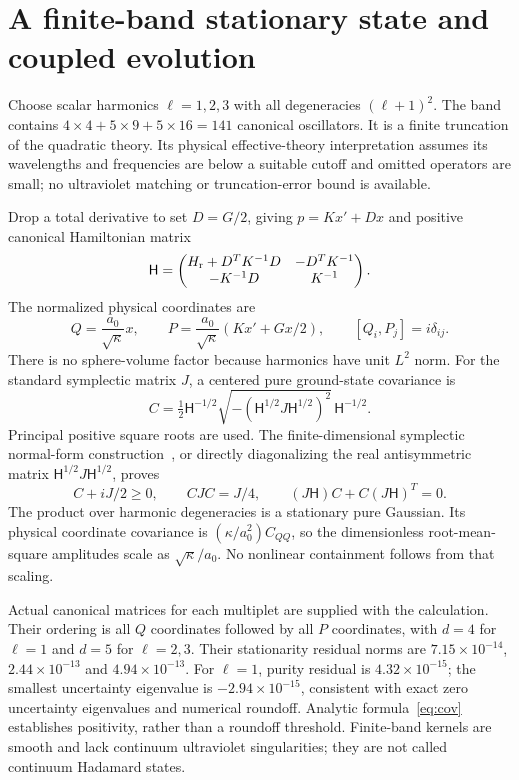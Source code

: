 \documentclass[11pt]{article}
\newcommand{\HH}{\mathsf H}
\numberwithin{equation}{section}
\begin{document}
\section{A finite-band stationary state and coupled evolution}

Choose scalar harmonics $\ell=1,2,3$ with all degeneracies $(\ell+1)^2$.
The band contains $4\times4+5\times9+5\times16=141$ canonical oscillators.
It is a finite truncation of the quadratic theory.
Its physical effective-theory interpretation assumes its wavelengths and frequencies are below a suitable cutoff and omitted operators are small; no ultraviolet matching or truncation-error bound is available.

Drop a total derivative to set $D=G/2$, giving $p=Kx'+Dx$ and positive canonical Hamiltonian matrix
\begin{equation}
 \HH=\begin{pmatrix}H_{\rm r}+D^TK^{-1}D&-D^TK^{-1}\\-K^{-1}D&K^{-1}\end{pmatrix}.
\end{equation}
The normalized physical coordinates are
\begin{equation}
 Q=\frac{a_0}{\sqrt\kappa}x,\qquad
 P=\frac{a_0}{\sqrt\kappa}(Kx'+Gx/2),\qquad [Q_i,P_j]=i\delta_{ij}.
 \label{eq:normalization}
\end{equation}
There is no sphere-volume factor because harmonics have unit $L^2$ norm.
For the standard symplectic matrix $J$, a centered pure ground-state covariance is
\begin{equation}
 C=\tfrac12\HH^{-1/2}
 \sqrt{-(\HH^{1/2}J\HH^{1/2})^2}\,\HH^{-1/2}.
 \label{eq:cov}
\end{equation}
Principal positive square roots are used.
The finite-dimensional symplectic normal-form construction~\cite{williamson}, or directly diagonalizing the real antisymmetric matrix $\HH^{1/2}J\HH^{1/2}$, proves
\begin{equation}
 C+iJ/2\ge0,\qquad CJC=J/4,\qquad (J\HH)C+C(J\HH)^T=0.
\end{equation}
The product over harmonic degeneracies is a stationary pure Gaussian.
Its physical coordinate covariance is $(\kappa/a_0^2)C_{QQ}$, so the dimensionless root-mean-square amplitudes scale as $\sqrt\kappa/a_0$.
No nonlinear containment follows from that scaling.

Actual canonical matrices for each multiplet are supplied with the calculation.
Their ordering is all $Q$ coordinates followed by all $P$ coordinates, with $d=4$ for $\ell=1$ and $d=5$ for $\ell=2,3$.
Their stationarity residual norms are $7.15\times10^{-14}$, $2.44\times10^{-13}$ and $4.94\times10^{-13}$.
For $\ell=1$, purity residual is $4.32\times10^{-15}$; the smallest uncertainty eigenvalue is $-2.94\times10^{-15}$, consistent with exact zero uncertainty eigenvalues and numerical roundoff.
Analytic formula~\eqref{eq:cov} establishes positivity, rather than a roundoff threshold.
Finite-band kernels are smooth and lack continuum ultraviolet singularities; they are not called continuum Hadamard states.
\end{document}
